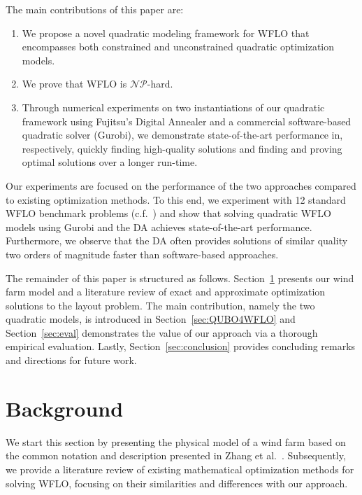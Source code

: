 \documentclass[preprint,12pt]{elsarticle}
\begin{document}
The main
contributions of this paper are:
\begin{enumerate} 
\item We propose a novel quadratic modeling framework for WFLO that encompasses both constrained and unconstrained quadratic optimization models.
\item We prove that WFLO is $\mathcal{NP}$-hard.
\item Through numerical experiments on two instantiations of our quadratic framework using Fujitsu's Digital Annealer and a commercial software-based quadratic solver (Gurobi), we demonstrate state-of-the-art performance in, respectively, quickly finding high-quality solutions and finding and proving optimal solutions over a longer run-time.
\end{enumerate}

Our experiments are focused on the performance of the two approaches
compared to 
existing optimization methods. To this end,
we experiment with 12 standard WFLO benchmark problems (c.f.~\cite{turner2014new})
and show that solving quadratic WFLO models
using Gurobi and the DA
achieves state-of-the-art performance.
Furthermore, we observe that the DA 
often provides solutions of similar quality two orders of magnitude faster
than software-based approaches.

The remainder of this paper is structured as follows. Section~\ref{sec:related} presents our wind farm model and a literature review of exact and approximate
optimization solutions to the layout problem. The main contribution, namely the two quadratic models, is introduced in Section~\ref{sec:QUBO4WFLO} and Section~\ref{sec:eval} demonstrates the value of our approach via a thorough empirical evaluation.
Lastly, Section~\ref{sec:conclusion} provides concluding remarks and directions for future work.   


\section{Background}
\label{sec:related}

We start this section by presenting the physical model of a wind farm
based on the common
notation and description presented in Zhang et al.\ \cite{Zhang2014}.  Subsequently,
we provide a literature review of existing mathematical optimization
methods for solving WFLO, focusing on their similarities and
differences with our approach.
 
\end{document}
